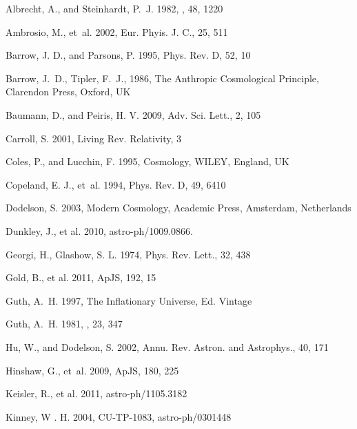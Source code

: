 \documentclass{rmaa}
\begin{document}
\begin{thebibliography}

 Albrecht, A., and {Steinhardt,} P.~J. 1982, \prl, 48,  1220  

Ambrosio, M., et~al. 2002, Eur. Phyis. J. C., 25, 511  

Barrow, J. D., and {Parsons}, P. 1995, Phys. Rev. D, 52, 10 
  
Barrow, J.~D., Tipler, F.~J., 1986, The Anthropic Cosmological Principle,
  Clarendon Press, Oxford, UK 

 Baumann, D., and  {Peiris,} H. V. 2009, Adv. Sci. Lett., 2, 105

Carroll, S. 2001, Living Rev. Relativity, 3
   
Coles, P., and Lucchin, F. 1995, Cosmology, WILEY, England, UK 

  Copeland, E. J., et~al. 1994, Phys. Rev. D, 49, 6410

Dodelson, S. 2003, Modern Cosmology, Academic Press, Amsterdam, Netherlands 

  Dunkley, J.,  et al. 2010, astro-ph/1009.0866. 
 
Georgi, H., Glashow, S. L. 1974, Phys. Rev. Lett., 32, 438
 
Gold, B., et al. 2011, ApJS, 192, 15

Guth, A.~H. 1997, The Inflationary Universe,  Ed. Vintage
        
Guth, A.~H. 1981, \prd, 23,  347 

Hu, W., and {Dodelson,} S. 2002, Annu. Rev. Astron. and Astrophys., 40, 171 
 
Hinshaw, G., et~al. 2009, ApJS, 180, 225

  Keisler, R., et al. 2011, astro-ph/1105.3182  
 
  Kinney, W . H. 2004, CU-TP-1083, astro-ph/0301448
 

\end{thebibliography}
\end{document}
